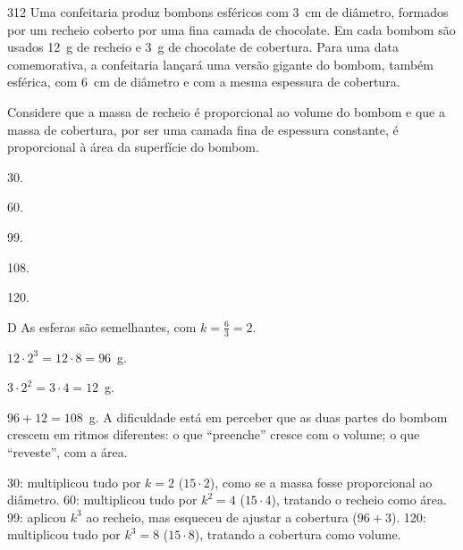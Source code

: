 \begin{questaoinedita}{3}{12}
Uma confeitaria produz bombons esféricos com 3~cm de diâmetro, formados por um
recheio coberto por uma fina camada de chocolate. Em cada bombom são usados
12~g de recheio e 3~g de chocolate de cobertura. Para uma data comemorativa, a
confeitaria lançará uma versão gigante do bombom, também esférica, com 6~cm de
diâmetro e com a mesma espessura de cobertura.

Considere que a massa de recheio é proporcional ao volume do bombom e que a
massa de cobertura, por ser uma camada fina de espessura constante, é
proporcional à área da superfície do bombom.

\begin{alternativas*}[5]
  \item 30.
  \item 60.
  \item 99.
  \item 108.
  \item 120.
\end{alternativas*}
\end{questaoinedita}
\begin{resolucao}{D}
 As esferas são semelhantes, com
$k = \frac{6}{3} = 2$.

 $12\cdot 2^3 = 12\cdot 8 = 96$~g.

 $3\cdot 2^2 = 3\cdot 4 = 12$~g.

 $96 + 12 = 108$~g. A dificuldade está em perceber que as duas
partes do bombom crescem em ritmos diferentes: o que “preenche” cresce com o
volume; o que “reveste”, com a área.

\begin{distratores}
 30: multiplicou tudo por $k = 2$ ($15\cdot 2$), como se a massa fosse
proporcional ao diâmetro.
 60: multiplicou tudo por $k^2 = 4$ ($15\cdot 4$), tratando o recheio como
área.
 99: aplicou $k^3$ ao recheio, mas esqueceu de ajustar a cobertura
($96 + 3$).
 120: multiplicou tudo por $k^3 = 8$ ($15\cdot 8$), tratando a cobertura
como volume.
\end{distratores}
\end{resolucao}

